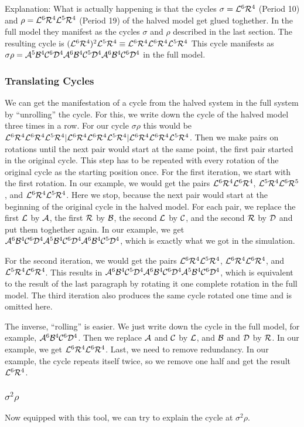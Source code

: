 Explanation: What is actually happening is that the cycles $\sigma = \mathcal{L}^6\mathcal{R}^4$ (Period 10) and $\rho = \mathcal{L}^6\mathcal{R}^4\mathcal{L}^5\mathcal{R}^4$ (Period 19) of the halved model get glued toghether.
In the full model they manifest as the cycles $\sigma$ and $\rho$ described in the last section.
The resulting cycle is $(\mathcal{L}^6\mathcal{R}^4)^2\mathcal{L}^5\mathcal{R}^4 \equiv \mathcal{L}^6\mathcal{R}^4\mathcal{L}^6\mathcal{R}^4\mathcal{L}^5\mathcal{R}^4$
This cycle manifests as $\sigma\rho = \mathcal{A}^5\mathcal{B}^4\mathcal{C}^6\mathcal{D}^4\mathcal{A}^6\mathcal{B}^4\mathcal{C}^5\mathcal{D}^4\mathcal{A}^6\mathcal{B}^4\mathcal{C}^6\mathcal{D}^4$ in the full model.

\subsubsection{Translating Cycles}

We can get the manifestation of a cycle from the halved system in the full system by ``unrolling'' the cycle.
For this, we write down the cycle of the halved model three times in a row.
For our cycle $\sigma\rho$ this would be $\mathcal{L}^6\mathcal{R}^4\mathcal{L}^6\mathcal{R}^4\mathcal{L}^5\mathcal{R}^4|\mathcal{L}^6\mathcal{R}^4\mathcal{L}^6\mathcal{R}^4\mathcal{L}^5\mathcal{R}^4|\mathcal{L}^6\mathcal{R}^4\mathcal{L}^6\mathcal{R}^4\mathcal{L}^5\mathcal{R}^4$.
Then we make pairs on rotations until the next pair would start at the same point, the first pair started in the original cycle.
This step has to be repeated with every rotation of the original cycle as the starting position once.
For the first iteration, we start with the first rotation.
In our example, we would get the pairs $\mathcal{L}^6\mathcal{R}^4\mathcal{L}^6\mathcal{R}^4$, $\mathcal{L}^5\mathcal{R}^4\mathcal{L}^6\mathcal{R}^5$, and $\mathcal{L}^6\mathcal{R}^4\mathcal{L}^5\mathcal{R}^4$.
Here we stop, because the next pair would start at the beginning of the original cycle in the halved model.
For each pair, we replace the first $\mathcal{L}$ by $\mathcal{A}$, the first $\mathcal{R}$ by $\mathcal{B}$, the second $\mathcal{L}$ by $\mathcal{C}$, and the second $\mathcal{R}$ by $\mathcal{D}$ and put them toghether again.
In our example, we get $\mathcal{A}^6\mathcal{B}^4\mathcal{C}^6\mathcal{D}^4\mathcal{A}^5\mathcal{B}^4\mathcal{C}^6\mathcal{D}^4\mathcal{A}^6\mathcal{B}^4\mathcal{C}^5\mathcal{D}^4$, which is exactly what we got in the simulation.

For the second iteration, we would get the pairs $\mathcal{L}^6\mathcal{R}^4\mathcal{L}^5\mathcal{R}^4$, $\mathcal{L}^6\mathcal{R}^4\mathcal{L}^6\mathcal{R}^4$, and $\mathcal{L}^5\mathcal{R}^4\mathcal{L}^6\mathcal{R}^4$.
This results in $\mathcal{A}^6\mathcal{B}^4\mathcal{C}^5\mathcal{D}^4\mathcal{A}^6\mathcal{B}^4\mathcal{C}^6\mathcal{D}^4\mathcal{A}^5\mathcal{B}^4\mathcal{C}^6\mathcal{D}^4$, which is equivalent to the result of the last paragraph by rotating it one complete rotation in the full model.
The third iteration also produces the same cycle rotated one time and is omitted here.

The inverse, ``rolling'' is easier.
We just write down the cycle in the full model, for example, $\mathcal{A}^6\mathcal{B}^4\mathcal{C}^6\mathcal{D}^4$.
Then we replace $\mathcal{A}$ and $\mathcal{C}$ by $\mathcal{L}$, and $\mathcal{B}$ and $\mathcal{D}$ by $\mathcal{R}$.
In our example, we get $\mathcal{L}^6\mathcal{R}^4\mathcal{L}^6\mathcal{R}^4$.
Last, we need to remove redundancy.
In our example, the cycle repeats itself twice, so we remove one half and get the result $\mathcal{L}^6\mathcal{R}^4$.

\subsubsection{$\sigma^2\rho$}

Now equipped with this tool, we can try to explain the cycle at $\sigma^2\rho$.
